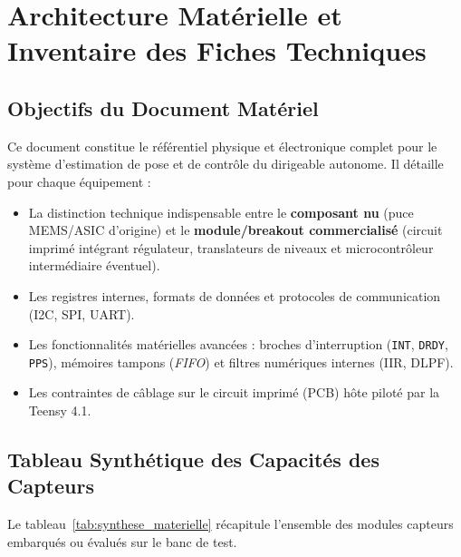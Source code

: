 \documentclass[../Materiel.tex]{subfiles}
\begin{document}
\section{Architecture Matérielle et Inventaire des Fiches Techniques}

\subsection{Objectifs du Document Matériel}
Ce document constitue le référentiel physique et électronique complet pour le système d'estimation de pose et de contrôle du dirigeable autonome. Il détaille pour chaque équipement :
\begin{itemize}
    \item La distinction technique indispensable entre le \textbf{composant nu} (puce MEMS/ASIC d'origine) et le \textbf{module/breakout commercialisé} (circuit imprimé intégrant régulateur, translateurs de niveaux et microcontrôleur intermédiaire éventuel).
    \item Les registres internes, formats de données et protocoles de communication (I2C, SPI, UART).
    \item Les fonctionnalités matérielles avancées : broches d'interruption (\texttt{INT}, \texttt{DRDY}, \texttt{PPS}), mémoires tampons (\textit{FIFO}) et filtres numériques internes (IIR, DLPF).
    \item Les contraintes de câblage sur le circuit imprimé (PCB) hôte piloté par la Teensy 4.1.
\end{itemize}

\subsection{Tableau Synthétique des Capacités des Capteurs}

Le tableau~\ref{tab:synthese_materielle} récapitule l'ensemble des modules capteurs embarqués ou évalués sur le banc de test.
\end{document}
